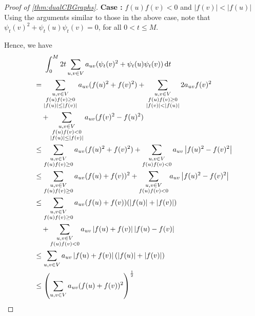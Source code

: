 \documentclass[12pt,a4paper,bold]{thesis}
\theoremstyle{definition}
\newcommand*{\abs}[1]{\left\vert #1 \right\vert}
\newcounter{casenum}
\newenvironment{caseof}{\setcounter{casenum}{1}}{\vskip0\baselineskip}
\newcommand{\case}[2]{\vskip0\baselineskip\par\noindent 
{\bfseries Case \arabic{casenum}:} #1\\#2\addtocounter{casenum}{1}}
\begin{document}
\begin{proof}[Proof of \cref{thm:dualCBGraphs}]
\begin{caseof}
        \case{$f(u)f(v) < 0$ and $\abs{f(v)} < \abs{f(u)}$}
        {Using the arguments similar to those in the above case, note that
        $\psi_t(v)^2 + \psi_t(u)\psi_t(v) = 0$, for all $0 < t \leq M$.}
    \end{caseof}
    Hence, we have
    \begin{align} \label{ineq:num-betaT}
        & \hspace{0.49cm}
        \int_{0}^{M} 2t \sum_{u,v \in V} a_{uv} 
        (\psi_t(v)^2 + \psi_t(u)\psi_t(v))\, \mathrm{d}t \nonumber
        \\ 
        & = 
        \sum_{\substack{u,v \in V \\ f(u)f(v) \geq 0 \\ \abs{f(u)} \leq \abs{f(v)}}} 
        a_{uv} (f(u)^2 + f(v)^2)
        + \sum_{\substack{u,v \in V \\ f(u)f(v) \geq 0 \\ \abs{f(v)} < \abs{f(u)}}} 
        2 a_{uv} f(v)^2 \nonumber
        \\
        & \quad +
        \sum_{\substack{u,v \in V \\ f(u)f(v) < 0 \\ \abs{f(u)} \leq \abs{f(v)}}} 
        a_{uv} (f(v)^2 - f(u)^2) \nonumber
        \\
        & \leq
        \sum_{\substack{u,v \in V \\ f(u)f(v) \geq 0}} a_{uv} (f(u)^2 + f(v)^2)
        + \sum_{\substack{u,v \in V \\ f(u)f(v) < 0}} a_{uv} \abs{f(u)^2 - f(v)^2} \nonumber
        \\
        & \leq
        \sum_{\substack{u,v \in V \\ f(u)f(v) \geq 0}} a_{uv} (f(u) + f(v))^2
        + \sum_{\substack{u,v \in V \\ f(u)f(v) < 0}} a_{uv} \abs{f(u)^2 - f(v)^2} \nonumber
        \\
        & \leq
        \sum_{\substack{u,v \in V \\ f(u)f(v) \geq 0}} 
        a_{uv} (f(u) + f(v))(\abs{f(u)} + \abs{f(v)}) \nonumber
        \\
        & \quad +
        \sum_{\substack{u,v \in V \\ f(u)f(v) < 0}} a_{uv} \abs{f(u) + f(v)} \abs{f(u) - f(v)} \nonumber
        \\
        & \leq
        \sum_{u,v \in V} a_{uv} \abs{f(u) + f(v)}(\abs{f(u)} + \abs{f(v)}) \nonumber
        \\
        & \leq
        \left(\sum_{u,v \in V} a_{uv} (f(u) + f(v))^2\right)^\frac{1}{2}

\end{align}
\end{proof}
\end{document}
